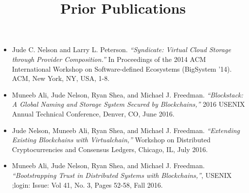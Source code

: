 \documentclass{article}
\title{Prior Publications}
\date{}
\begin{document}
\maketitle

\begin{itemize}
\item Jude C. Nelson and Larry L. Peterson. \emph{``Syndicate: Virtual Cloud
Storage through Provider Composition.''} In Proceedings of the 2014 ACM
International Workshop on Software-defined Ecosystems (BigSystem '14).
ACM, New York, NY, USA, 1-8.
\item Muneeb Ali, Jude Nelson, Ryan Shea, and Michael J. Freedman.
\emph{``Blockstack: A Global Naming and Storage System Secured by
Blockchains,''} 2016 USENIX Annual Technical Conference, Denver, CO, June 2016.
\item Jude Nelson, Muneeb Ali, Ryan Shea, and Michael J. Freedman.
\emph{``Extending Existing Blockchains with Virtualchain,''} Workshop on
Distributed Cryptocurrencies and Consensus Ledgers, Chicago, IL, July 2016.
\item Muneeb Ali, Jude Nelson, Ryan Shea, and Michael J. Freedman.
\emph{``Bootstrapping Trust in Distributed Systems with Blockchains,''}, USENIX
;login: Issue: Vol 41, No. 3, Pages 52-58, Fall 2016.
\end{itemize}
\end{document}

